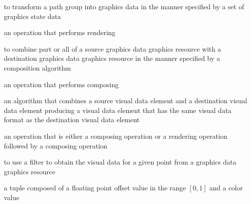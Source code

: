 to transform a path group into graphics data in the manner specified by a set of graphics state data

an operation that performs rendering

to combine part or all of a source graphics data graphics resource with a destination graphics data graphics resource in the manner specified by a composition algorithm

an operation that performs composing

an algorithm that combines a source visual data element and a destination visual data element producing a visual data element that has the same visual data format as the destination visual data element

an operation that is either a composing operation or a rendering operation followed by a composing operation

to use a filter to obtain the visual data for a given point from a graphics data graphics resource

a tuple composed of a floating point offset value in the range $[0, 1]$ and a color value



%
%

